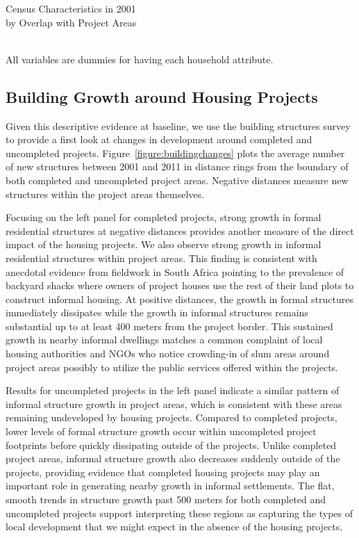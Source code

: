 \documentclass[12pt]{article}
\begin{document}
\begin{table}
\caption{Census Characteristics in 2001 \\ by Overlap with Project Areas}\label{table:censusdescriptives}
\centering
 \\
All variables are dummies for having each household attribute.
\end{table}

\subsection{Building Growth around Housing Projects}

Given this descriptive evidence at baseline, we use the building structures survey to provide a first look at changes in development around completed and uncompleted projects.  Figure~\ref{figure:buildingchanges} plots the average number of new structures between 2001 and 2011 in distance rings from the boundary of both completed and uncompleted project areas.  Negative distances measure new structures within the project areas themselves.  

Focusing on the left panel for completed projects, strong growth in formal residential structures at negative distances provides another measure of the direct impact of the housing projects.  We also observe strong growth in informal residential structures within project areas.  This finding is consistent with anecdotal evidence from fieldwork in South Africa pointing to the prevalence of backyard shacks where owners of project houses use the rest of their land plots to construct informal housing.  At positive distances, the growth in formal structures immediately dissipates while the growth in informal structures remains substantial up to at least 400 meters from the project border.  This sustained growth in nearby informal dwellings matches a common complaint of local housing authorities and NGOs who notice crowding-in of slum areas around project areas possibly to utilize the public services offered within the projects.  	

Results for uncompleted projects in the left panel indicate a similar pattern of informal structure growth in project areas, which is consistent with these areas remaining undeveloped by housing projects.  Compared to completed projects, lower levels of formal structure growth occur within uncompleted project footprints before quickly dissipating outside of the projects.  Unlike completed project areas, informal structure growth also decreases suddenly outside of the projects, providing evidence that completed housing projects may play an important role in generating nearby growth in informal settlements.  The flat, smooth trends in structure growth past 500 meters for both completed and uncompleted projects support interpreting these regions as capturing the types of local development that we might expect in the absence of the housing projects.
\end{document}

